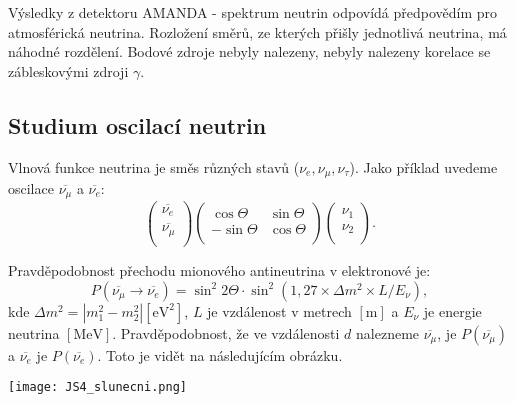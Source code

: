 \documentclass[../../main.tex]{subfiles}
\begin{document}
Výsledky z detektoru AMANDA - spektrum neutrin odpovídá předpovědím pro atmosférická neutrina. Rozložení směrů, ze kterých přišly jednotlivá neutrina, má náhodné rozdělení. Bodové zdroje nebyly nalezeny, nebyly nalezeny korelace se zábleskovými zdroji $\gamma$. 	

\subsection{Studium oscilací neutrin}

Vlnová funkce neutrina je směs různých stavů ($\nu_e, \nu_{\mu}, \nu_{\tau}$). Jako příklad uvedeme oscilace $\overline{\nu_{\mu}}$ a $\overline{\nu_e}$:
\begin{equation}
\left( {\begin{array}{c}
	\overline{\nu_e}   \\
	\overline{\nu_{\mu}}  \\
	\end{array} } \right)
\left({\begin{array}{cc}
\cos \Theta & \sin \Theta \\
	- \sin \Theta & \cos \Theta \\
	\end{array} } \right)
\left( {\begin{array}{c}
	\nu_1   \\
	\nu_2  \\
	\end{array} } \right).
\end{equation} 

Pravděpodobnost přechodu mionového antineutrina v elektronové je:
\begin{equation}
P(\overline{\nu_{\mu}} \rightarrow \overline{\nu_e}) = \sin^2 2\Theta \cdotp \sin ^2 (1,27 \times \Delta m^2 \times L/E_{\nu}),
\end{equation}
kde $\Delta m ^2 = \left| m_{1}^2 - m_{2}^2 \right| [\mathrm{eV^2}]$, $L$ je vzdálenost v metrech $[\mathrm{m}]$ a $E_{\nu}$ je energie neutrina $[\mathrm{MeV}]$. Pravděpodobnost, že ve vzdálenosti $d$ nalezneme $\overline{\nu_{\mu}}$, je $P(\overline{\nu_{\mu}}) $ a $\overline{\nu_e}$ je $P(\overline{\nu_e})$. Toto je vidět na následujícím obrázku.

\begin{center}
	\texttt{[image: JS4\_slunecni.png]}
\end{center}
\end{document}
